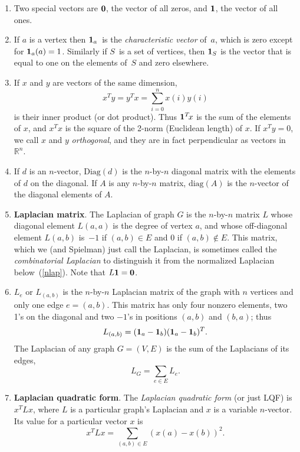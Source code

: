 \documentclass[11pt]{article}
\newcommand{\m}[1]{{\bf{#1}}}       %
\newcommand{\ones}{\m1}             %
\newcommand{\zeros}{\m0}            %
\newcommand{\diag}{\mbox{diag}}
\newcommand{\Diag}{\mbox{Diag}}
\newcommand{\Real}{\mathbb{R}}      %
\begin{document}
\begin{enumerate}
\item
Two special vectors are $\zeros$, the vector of all zeros,
and $\ones$, the vector of all ones.

\item
If $a$ is a vertex then $\ones_a$~is the 
{\em characteristic vector} of~$a$, which
is zero except for $\ones_a(a)=1$.
Similarly if $S$~is a set of vertices, 
then $\ones_S$ is the vector that is equal to one
on the elements of~$S$ and zero elsewhere.

\item
If $x$ and $y$ are vectors of the same dimension, 
$$x^Ty = y^Tx = \sum_{i=0}^{n}x(i)y(i)$$
is their inner product (or dot product).
Thus $\ones^T\!x$ is the sum of the elements of $x$,
and $x^Tx$ is the square of the 2-norm (Euclidean length) of $x$.
If $x^Ty=0$, we call $x$ and $y$ {\em orthogonal}, 
and they are in fact perpendicular as vectors in $\Real^n$.

\item
If $d$ is an $n$-vector, $\Diag(d)$ is the $n$-by-$n$ diagonal 
matrix with the elements of $d$ on the diagonal.
If $A$ is any $n$-by-$n$ matrix, $\diag(A)$ is the $n$-vector
of the diagonal elements of $A$.

\item\label{lap}{\bf Laplacian matrix}.
The Laplacian of graph $G$ is the $n$-by-$n$ matrix $L$
whose diagonal element $L(a,a)$ is the degree of vertex $a$, 
and whose off-diagonal element $L(a,b)$ is~$-1$ if $(a,b) \in E$ 
and $0$ if $(a,b) \notin E$.
This matrix, which we (and Spielman) just call the Laplacian,
is sometimes called the {\em combinatorial Laplacian} to 
distinguish it from the normalized Laplacian below~(\ref{nlap}).
Note that $ L\ones = \zeros$.

\item
$L_e$ or $L_{(a,b)}$ is the $n$-by-$n$ Laplacian matrix
of the graph with $n$ vertices and only one edge $e = (a,b)$.
This matrix has only four nonzero elements, two 1's on the
diagonal and two $-1$'s in positions $(a,b)$ and $(b,a)$;
thus 
$$L_{(a,b)}=(\ones_a-\ones_b)(\ones_a-\ones_b)^T.$$
The Laplacian of any graph $G=(V,E)$ is the sum of the Laplacians
of its edges,
$$L_G = \sum_{e\in E} L_e.$$

\item\label{LQF}{\bf Laplacian quadratic form}.
The {\em Laplacian quadratic form} (or just LQF) is $x^TLx$,
where $L$ is a particular graph's Laplacian and $x$ is a variable $n$-vector.
Its value for a particular vector $x$ is 
$$x^TLx = \sum_{(a,b)\in E}(x(a)-x(b))^2.$$


\end{enumerate}
\end{document}
